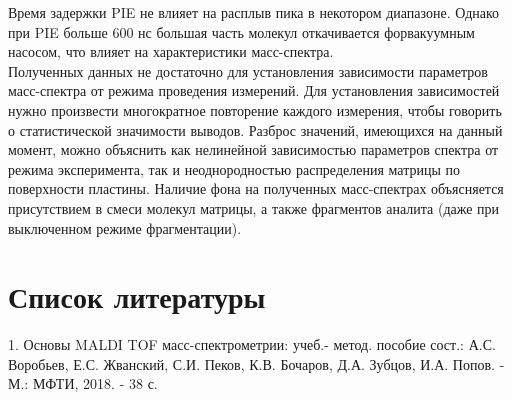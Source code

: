 \documentclass[12pt]{article}
\begin{document}
\begin{flushleft}
Время задержки PIE не влияет на расплыв пика в некотором диапазоне. Однако при PIE больше 600 нс большая часть молекул откачивается форвакуумным насосом, что влияет на 
характеристики масс-спектра.\\
 
Полученных данных не достаточно для установления зависимости параметров масс-спектра от режима проведения измерений. Для установления зависимостей нужно произвести многократное повторение каждого измерения, чтобы говорить о статистической значимости выводов. 
Разброс значений, имеющихся на данный момент, можно объяснить как 
нелинейной зависимостью параметров спектра от режима эксперимента, 
так и неоднородностью распределения матрицы по поверхности пластины. 
Наличие фона на полученных масс-спектрах объясняется присутствием в смеси молекул матрицы, а также фрагментов аналита (даже при 
выключенном режиме фрагментации).
\section{Список литературы}
1. Основы MALDI TOF масс-спектрометрии: учеб.- метод. пособие
сост.: А.С. Воробьев, Е.С. Жванский, С.И. Пеков, К.В. Бочаров,
Д.А. Зубцов, И.А. Попов. - М.: МФТИ, 2018. - 38 с.


\end{flushleft}
\end{document}
